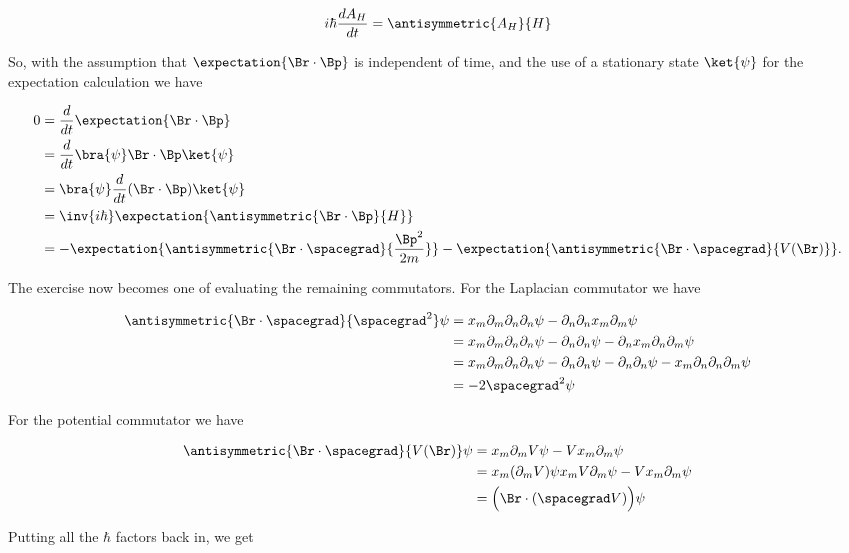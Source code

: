 \begin{align}\label{eqn:desaiCh3:103}
i\hbar \frac{d A_H}{dt} = \antisymmetric{A_H}{H}
\end{align}

So, with the assumption that $\expectation{\Br \cdot \Bp}$ is independent of time, and the use of a stationary state $\ket{\psi}$ for the expectation calculation we have

\begin{align*}
0 &=
\frac{d}{dt} \expectation{\Br \cdot \Bp}  \\
&=
\frac{d}{dt} \bra{\psi} \Br \cdot \Bp \ket{\psi} \\
&=
\bra{\psi} 
\frac{d}{dt} ( \Br \cdot \Bp ) \ket{\psi} \\
&= 
\inv{i\hbar} \expectation{ \antisymmetric{ \Br \cdot \Bp }{H} } \\
&= 
-\expectation{ \antisymmetric{ \Br \cdot \spacegrad }{\frac{\Bp^2}{2m}} } 
-\expectation{ \antisymmetric{ \Br \cdot \spacegrad }{V(\Br)} }.
\end{align*}

The exercise now becomes one of evaluating the remaining commutators.  For the Laplacian commutator we have

\begin{align*}
\antisymmetric{ \Br \cdot \spacegrad }{\spacegrad^2} \psi
&=
x_m \partial_m \partial_n \partial_n \psi 
- \partial_n \partial_n x_m \partial_m \psi \\
&=
x_m \partial_m \partial_n \partial_n \psi 
- \partial_n \partial_n \psi 
- \partial_n x_m \partial_n \partial_m \psi \\
&=
x_m \partial_m \partial_n \partial_n \psi 
- \partial_n \partial_n \psi 
- \partial_n \partial_n \psi 
- x_m \partial_n \partial_n \partial_m \psi \\
&=
- 2 \spacegrad^2 \psi
\end{align*}

For the potential commutator we have

\begin{align*}
\antisymmetric{ \Br \cdot \spacegrad }{V(\Br)} \psi
&=
x_m \partial_m V \psi 
-V x_m \partial_m \psi  \\
&=
x_m (\partial_m V) \psi 
x_m V \partial_m \psi 
-V x_m \partial_m \psi  \\
&=
\Bigl( \Br \cdot (\spacegrad V) \Bigr) \psi
\end{align*}

Putting all the $\hbar$ factors back in, we get


